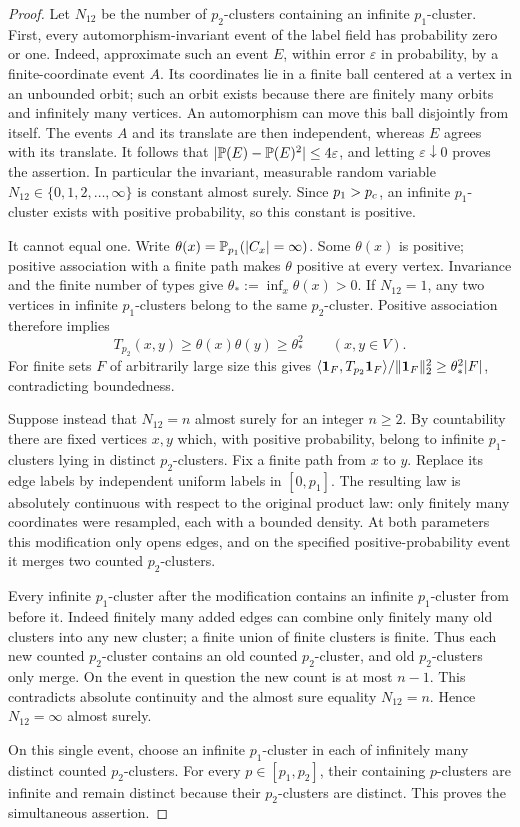 \begin{proof}
Let $N_{12}$ be the number of $p_2$-clusters containing an infinite
$p_1$-cluster. First, every automorphism-invariant event of the label
field has probability zero or one. Indeed, approximate such an event
$E$, within error $\varepsilon$ in probability, by a finite-coordinate
event $A$. Its coordinates lie in a finite ball centered at a vertex
in an unbounded orbit; such an orbit exists because there are finitely
many orbits and infinitely many vertices. An automorphism can move
this ball disjointly from itself. The events $A$ and its translate are
then independent, whereas $E$ agrees with its translate. It follows
that $\lvert\mathbb P(E)-\mathbb P(E)^2\rvert\le4\varepsilon$, and letting
$\varepsilon\downarrow0$ proves the assertion.
In particular the invariant, measurable random variable
$N_{12}\in\{0,1,2,\ldots,\infty\}$ is constant almost surely.
Since $p_1>{p_c}$, an infinite $p_1$-cluster exists with positive
probability, so this constant is positive.

It cannot equal one. Write
$\theta(x)=\mathbb P_{p_1}(|C_x|=\infty)$. Some $\theta(x)$ is positive;
positive association with a finite path makes $\theta$ positive at
every vertex. Invariance and the finite number of types give
$\theta_*:=\inf_x\theta(x)>0$. If $N_{12}=1$, any two vertices in
infinite $p_1$-clusters belong to the same $p_2$-cluster. Positive
association therefore implies
\[
 T_{p_2}(x,y)\ge\theta(x)\theta(y)\ge\theta_*^2
 \qquad(x,y\in V).
\]
For finite sets $F$ of arbitrarily large size this gives
$\langle\mathbf 1_F,T_{p_2}\mathbf 1_F\rangle/\lVert\mathbf 1_F\rVert_2^2
\ge\theta_*^2|F|$, contradicting boundedness.

Suppose instead that $N_{12}=n$ almost surely for an integer $n\ge2$.
By countability there are fixed vertices $x,y$ which, with positive
probability, belong to infinite $p_1$-clusters lying in distinct
$p_2$-clusters. Fix a finite path from $x$ to $y$. Replace its edge
labels by independent uniform labels in $[0,p_1]$. The resulting law
is absolutely continuous with respect to the original product law:
only finitely many coordinates were resampled, each with a bounded
density. At both parameters this modification only opens edges, and
on the specified positive-probability event it merges two counted
$p_2$-clusters.

Every infinite $p_1$-cluster after the modification contains an
infinite $p_1$-cluster from before it. Indeed finitely many added edges
can combine only finitely many old clusters into any new cluster; a
finite union of finite clusters is finite. Thus each new counted
$p_2$-cluster contains an old counted $p_2$-cluster, and old
$p_2$-clusters only merge. On the event in question the new count is
at most $n-1$. This contradicts absolute continuity and the almost
sure equality $N_{12}=n$. Hence $N_{12}=\infty$ almost surely.

On this single event, choose an infinite $p_1$-cluster in each of
infinitely many distinct counted $p_2$-clusters. For every
$p\in[p_1,p_2]$, their containing $p$-clusters are infinite and remain
distinct because their $p_2$-clusters are distinct. This proves the
simultaneous assertion.
\end{proof}

